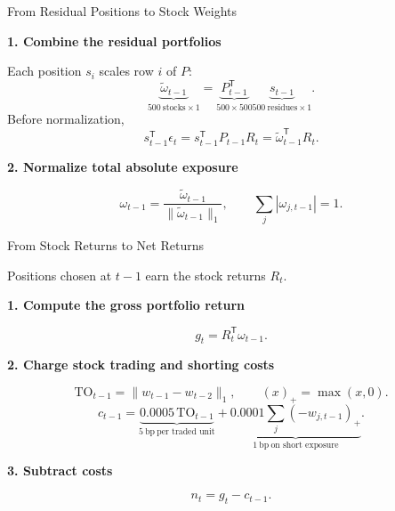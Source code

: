 \documentclass[11pt]{beamer}
\newcommand{\claim}[1]{%
  \par{\color{SBred}\bfseries #1\par}
}
\begin{document}
\begin{frame}{From Residual Positions to Stock Weights}

\claim{1. Combine the residual portfolios}\par
Each position $s_i$ scales row $i$ of $P$:
\[
\underbrace{\widetilde \omega_{t-1}}_{500\ \text{stocks}\times1}
=\underbrace{P_{t-1}^{\mathsf T}}_{500\times500}
\underbrace{s_{t-1}}_{500\ \text{residues}\times1}.
\]
Before normalization,
$$s_{t-1}^{\mathsf T}\epsilon_t
=s_{t-1}^{\mathsf T}P_{t-1}R_t
=\widetilde\omega_{t-1}^{\mathsf T}R_t.$$

\claim{2. Normalize total absolute exposure}\par
\[
\omega_{t-1}
=\frac{\widetilde \omega_{t-1}}{\|\widetilde \omega_{t-1}\|_1},
\qquad
\sum_j|\omega_{j,t-1}|=1.
\]

\end{frame}


\begin{frame}{From Stock Returns to Net Returns}
\small
\setlength{\abovedisplayskip}{2pt}
\setlength{\belowdisplayskip}{3pt}

Positions chosen at $t-1$ earn the stock returns $R_t$.

\claim{1. Compute the gross portfolio return}\par
\[
g_t=R_t^{\mathsf T}\omega_{t-1}.
\]

\claim{2. Charge stock trading and shorting costs}\par
\[
\mathrm{TO}_{t-1}
=\|w_{t-1}-w_{t-2}\|_1,
\qquad
(x)_+=\max(x,0).
\]
\[
c_{t-1}
=\underbrace{0.0005\,\mathrm{TO}_{t-1}}
            _{5\ \mathrm{bp}\ \text{per traded unit}}
+\underbrace{0.0001\sum_j(-w_{j,t-1})_+}
            _{1\ \mathrm{bp}\ \text{on short exposure}}.
\]

\claim{3. Subtract costs}\par
\[
n_t=g_t-c_{t-1}.
\]
\end{frame}
\end{document}
